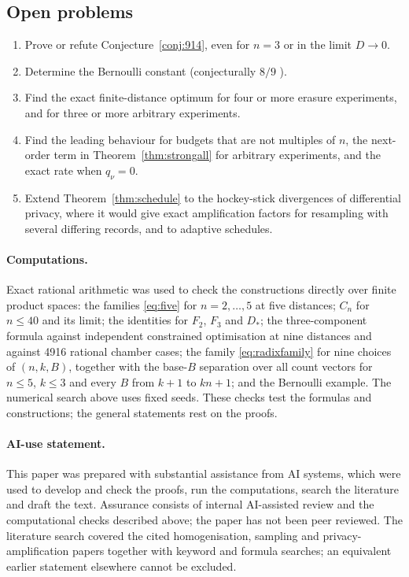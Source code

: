 \documentclass[11pt,a4paper]{article}
\theoremstyle{definition}\newtheorem{definition}[theorem]{Definition}
\theoremstyle{remark}\newtheorem{remark}[theorem]{Remark}
\begin{document}
\subsection{Open problems}
\begin{enumerate}[leftmargin=*]
\item Prove or refute Conjecture~\ref{conj:914}, even for $n=3$ or in the limit $D\to0$.
\item Determine the Bernoulli constant (conjecturally $8/9$ \cite{KJan}).
\item Find the exact finite-distance optimum for four or more erasure experiments, and for three or more arbitrary experiments.
\item Find the leading behaviour for budgets that are not multiples of $n$, the next-order term in Theorem~\ref{thm:strongall} for arbitrary experiments, and the exact rate when $q_\nu=0$.
\item Extend Theorem~\ref{thm:schedule} to the hockey-stick divergences of differential privacy, where it would give exact amplification factors for resampling with several differing records, and to adaptive schedules.
\end{enumerate}

\paragraph{Computations.} Exact rational arithmetic was used to check the constructions directly over finite product spaces: the families \eqref{eq:five} for $n=2,\ldots,5$ at five distances; $C_n$ for $n\le40$ and its limit; the identities for $F_2$, $F_3$ and $D_*$; the three-component formula against independent constrained optimisation at nine distances and against 4916 rational chamber cases; the family \eqref{eq:radixfamily} for nine choices of $(n,k,B)$, together with the base-$B$ separation over all count vectors for $n\le5$, $k\le3$ and every $B$ from $k+1$ to $kn+1$; and the Bernoulli example. The numerical search above uses fixed seeds. These checks test the formulas and constructions; the general statements rest on the proofs.

\paragraph{AI-use statement.} This paper was prepared with substantial assistance from AI systems, which were used to develop and check the proofs, run the computations, search the literature and draft the text. Assurance consists of internal AI-assisted review and the computational checks described above; the paper has not been peer reviewed. The literature search covered the cited homogenisation, sampling and privacy-amplification papers together with keyword and formula searches; an equivalent earlier statement elsewhere cannot be excluded.
\end{document}
